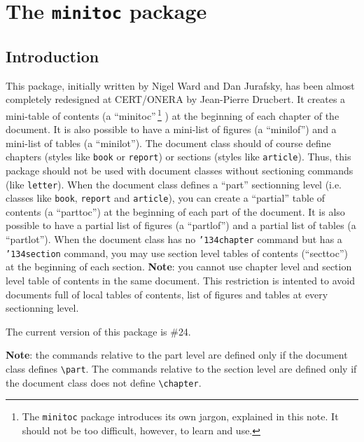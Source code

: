 \documentclass[12pt,a4paper]{book}
\newcommand\virage{\marginpar[\raggedleft
 {{\manfnt\symbol{'177}}~~}]{\raggedright {~~\manfnt\symbol{'177}}}}
\def\bs{{\tt\char'134}}
\begin{document}
\dominitoc
\dominilot
\faketableofcontents
\fakelistoftables
\chapter{The {\tt minitoc} package}\label{o+minitoc}
\pagestyle{headings}
\minitoc
\bigskip
\minilot
\section{Introduction}
This package, initially written by Nigel Ward and Dan Jurafsky, has been
almost completely redesigned at CERT/ONERA by Jean-Pierre Drucbert.
It creates a mini-table of contents
(a ``minitoc''\,\footnote{The \texttt{minitoc} package introduces
                its own jargon, explained in this note.
                It should not be too difficult, however, to learn and use.}%
) at the beginning of each chapter of the document. 
It is also possible to have a mini-list of
figures (a ``minilof'') and a mini-list of tables (a ``minilot'').
The document class should of course define chapters 
(styles like {\tt book} or {\tt report}) or sections
(styles like {\tt article}). 
Thus, this package should not be used with
document classes without sectioning commands (like {\tt letter}).
When the document class defines a ``part'' sectionning level 
(i.e. classes like {\tt book}, {\tt report} and {\tt article}), you can
create a ``partial'' table of contents
(a ``parttoc'') at the beginning of each part of the document.
It is also possible to have a partial list of figures (a ``partlof'')
and a partial list of tables (a ``partlot''). 
When the document class has no {\tt\bs chapter} command 
but has a {\tt\bs section} command, you may use section
level tables of contents (``secttoc'') at the beginning of each section.
{\bf Note}\virage: you cannot
use chapter level and section level table of contents in the same document.
This restriction is intented to avoid documents full of local
tables of contents, list of figures and tables at every sectionning level.

The current version of this package is \#24.

\noindent
{\bf Note}\virage: the commands relative
to the part level are defined only if the document class defines \verb|\part|.
The commands relative
to the section level are defined only if the document class
does not define \verb|\chapter|.
\end{document}
